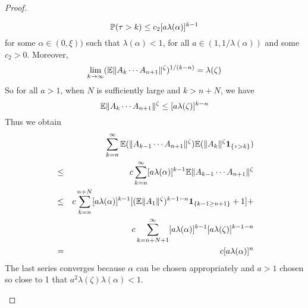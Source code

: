 \documentclass{article}
\theoremstyle{remark}
\begin{document}
\begin{proof}
\begin{enumerate}
      \begin{equation*}
        \P(\tau > k) \leq c_2 [a \lambda(\alpha)]^{k-1}
      \end{equation*}
      for some $\alpha \in (0, \xi))$ such that $\lambda(\alpha) < 1$,
      for all $a \in (1, 1/\lambda(\alpha))$ and some $c_2 > 0$.
      Moreover,
      \begin{equation*}
        \lim_{k \to \infty}
        (\E \|A_{k} \cdots A_{n+1}\|^{\zeta})^{1/(k-n)}
        = \lambda(\zeta)
      \end{equation*}
      So for all $a > 1$, when $N$ is sufficiently large and
      $k > n +N$, we have
      \begin{equation*}
        \E \|A_k \cdots A_{n+1}\|^{\zeta} \leq [a \lambda(\zeta)]^{k-n}
      \end{equation*}
      Thus we obtain
      \begin{eqnarray*}
        &&
        \sum_{k=n}^\infty
        \E (\|A_{k-1} \cdots A_{n+1}\|^\zeta)
        \E (\|A_k\|^\zeta \1{\tau > k}) \\
        &\leq&
        c \sum_{k=n}^\infty [a \lambda(\alpha)]^{k-1}
        \E \|A_{k-1} \cdots A_{n+1}\|^\zeta \\
        &\leq&
        c \sum_{k=n}^{n+N}
        [a \lambda(\alpha)]^{k-1}
        [
        (\E \|A_1\|^\zeta)^{k-1-n} \1{k-1 \geq n+1} + 1
        ] + \\
        &&
        c \sum_{k=n+N+1}^{\infty}
        [a \lambda(\alpha)]^{k-1}
        [a \lambda(\zeta)]^{k-1-n} \\
        &=& c [a \lambda(\alpha)]^n
      \end{eqnarray*}
      The last series converges because $\alpha$ can be chosen
      appropriately and $a > 1$ chosen so close to 1 that
      $a^2 \lambda(\zeta) \lambda(\alpha) < 1$.
    \end{enumerate}
\end{proof}




\end{document}
